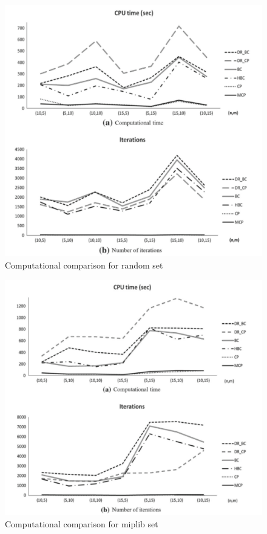 \documentclass{article}
\begin{document}
\begin{figure}
	\centering
	\includegraphics[width = 0.45\textheight]{run-times_2.pdf}
	\caption{Computational comparison for random set}
\end{figure}
\begin{figure}
	\centering
	\includegraphics[height = 0.45\textheight]{run-times.pdf}
	\caption{Computational comparison for miplib set}
\end{figure}
	\newpage
	
	
\end{document}

